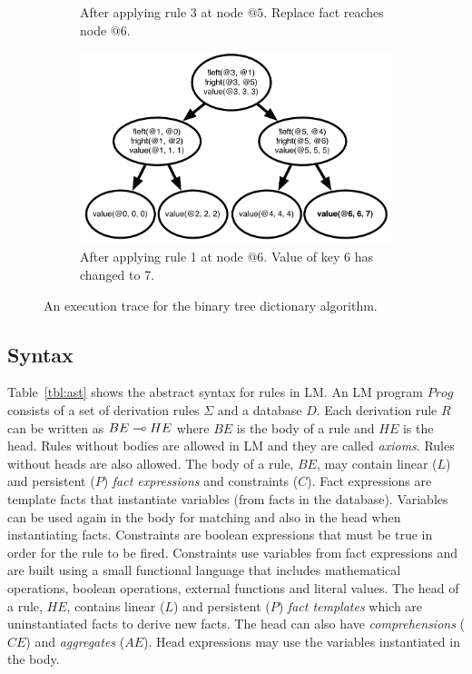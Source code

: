 \begin{figure}[h]
\begin{subfigure}[b]{0.5\textwidth}
                \caption{After applying rule 3 at node $@5$. Replace fact reaches node $@6$.}
                \label{fig:btree_trace3}
        \end{subfigure}%
        \begin{subfigure}[b]{0.5\textwidth}
                  \includegraphics[width=\textwidth]{btree_trace4}
                  \caption{After applying rule 1 at node $@6$. Value of key 6 has changed to 7.}
                  \label{fig:btree_trace4}
          \end{subfigure}
        \caption{An execution trace for the binary tree dictionary algorithm.}\label{fig:btree_trace}
        \vspace{-0.5\intextsep}
\end{figure}

\subsection{Syntax}

Table~\ref{tbl:ast} shows the abstract syntax for rules in LM.
An LM program $Prog$ consists of a set of derivation rules $\Sigma$ and a database $D$.
Each derivation rule $R$ can be written as $BE \multimap HE$ where $BE$ is the body of a rule and
$HE$ is the head. Rules without bodies are allowed in LM and they are called \textit{axioms}. Rules without heads are also allowed.
The body of a rule, $BE$, may contain linear ($L$) and persistent ($P$) \emph{fact expressions}
and constraints ($C$). Fact expressions are template facts that instantiate variables
(from facts in the database). Variables can be used again in the body for matching and
also in the head when instantiating facts. Constraints are boolean expressions that must
be true in order for the rule to be fired. Constraints use variables from fact expressions and are built using a small functional language that includes mathematical operations, boolean operations, external functions and literal values.
The head of a rule, $HE$, contains linear ($L$) and persistent ($P$) \emph{fact templates} which are uninstantiated facts to derive new facts. The head can also have \emph{comprehensions} ($CE$) and \emph{aggregates} ($AE$). Head
expressions may use the variables instantiated in the body.

